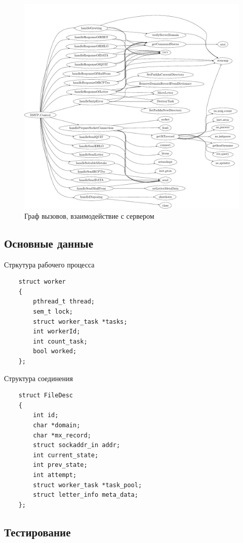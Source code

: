 \documentclass[a4paper,12pt]{report}
\begin{document}
\begin{figure}
    \centering
    \includegraphics[width=\textwidth]{include/ccflow02_dot.pdf}
    \caption{Граф вызовов, взаимодействие с сервером}
    \label{fig:ccflow02}
\end{figure}

\subsection*{Основные данные}

Стркутура рабочего процесса
\begin{verbatim}
    struct worker
    {
        pthread_t thread;
        sem_t lock;
        struct worker_task *tasks;
        int workerId;
        int count_task;
        bool worked;
    };
\end{verbatim}

Структура соединения
\begin{verbatim}
    struct FileDesc
    {
        int id;
        char *domain;
        char *mx_record;
        struct sockaddr_in addr;
        int current_state;
        int prev_state;
        int attempt;
        struct worker_task *task_pool;
        struct letter_info meta_data;
    };
\end{verbatim} 

\subsection*{Тестирование}
\end{document}
